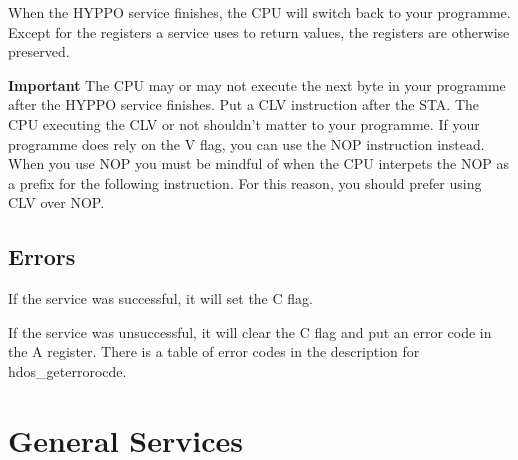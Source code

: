 When the HYPPO service finishes, the CPU will switch back to your programme.
Except for the registers a service uses to return values, the registers are
otherwise preserved.

\textbf{Important} The CPU may or may not execute the next byte in your
programme after the HYPPO service finishes. Put a CLV instruction after the STA.
The CPU executing the CLV or not shouldn't matter to your programme. If your
programme does rely on the V flag, you can use the NOP instruction instead. When
you use NOP you must be mindful of when the CPU interpets the NOP as a prefix
for the following instruction. For this reason, you should prefer using CLV
over NOP.

\subsection{Errors}

If the service was successful, it will set the C flag.

If the service was unsuccessful, it will clear the C flag and put an error code
in the A register. There is a table of error codes in the description for
hdos\_geterrorocde.



\newpage
\section{General Services}


